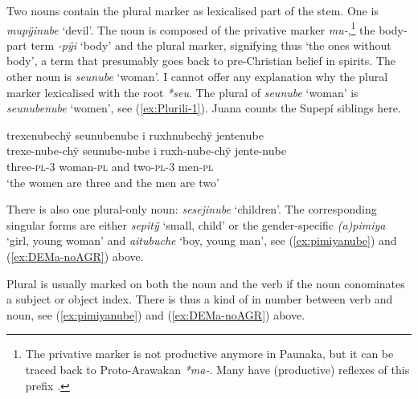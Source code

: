 Two nouns contain the plural marker as lexicalised part of the stem. One is \textit{mu\-pÿi\-nube} ‘devil’. The noun is composed of the privative marker \textit{mu-},\footnote{The privative marker is not productive anymore in Paunaka, but it can be traced back to Proto-Arawakan \textit{*ma-}. Many  have (productive) reflexes of this prefix \citep[276]{Michael2014b}.} the body-part term \textit{-pÿi} ‘body’ and the plural marker, signifying thus ‘the ones without body’, a term that presumably goes back to pre-Christian belief in spirits. The other noun is \textit{seunube} ‘woman’. I cannot offer any explanation why the plural marker lexicalised with the root \textit{*seu}. The plural of \textit{seunube} ‘woman’ is \textit{seunubenube} ‘women’, see (\ref{ex:Plurili-1}). Juana counts the Supepí siblings here.

\ea\label{ex:Plurili-1}
\begingl
\glpreamble trexenubechÿ seunubenube i ruxhnubechÿ jentenube\\
\gla trexe-nube-chÿ seunube-nube i ruxh-nube-chÿ jente-nube\\
\glb three-\textsc{pl}-3 woman-\textsc{pl} and two-\textsc{pl}-3 men-\textsc{pl}\\
\glft ‘the women are three and the men are two’
\endgl
\trailingcitation{[jxx-p120515l-2.239]}
\xe
{}

There is also one plural-only noun: \textit{sesejinube} ‘children’. The corresponding singular forms are either \textit{sepitÿ} ‘small, child’ or the gender-specific \textit{(a)pimiya} ‘girl, young woman’ and \textit{aitubuche} ‘boy, young man’, see (\ref{ex:pimiyanube}) and (\ref{ex:DEMa-noAGR}) above.

Plural is usually marked on both the noun and the verb if the noun conominates a subject or object index. There is thus a kind of  in number between verb and noun, see (\ref{ex:pimiyanube}) and (\ref{ex:DEMa-noAGR}) above.

